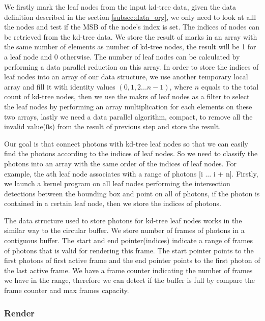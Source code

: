 We firstly mark the leaf nodes from the input kd-tree data, given the data definition described in the section \ref{subsec:data_org}, we only need to look at alll the nodes and test if the MSB of the node's index is set. The indices of nodes can be retrieved from the kd-tree data. We store the result of marks in an array with the same number of elements as number of kd-tree nodes, the result will be 1 for a leaf node and 0 otherwise. The number of leaf nodes can be calculated by performing a data parallel reduction on this array. In order to store the indices of leaf nodes into an array of our data structure, we use another temporary local array and fill it with identity values \( (0, 1, 2 ... n-1) \), where \(n\) equals to the total count of kd-tree nodes, then we use the makrs of leaf nodes as a filter to select the leaf nodes by performing an array multiplication for each elements on these two arrays, lastly we need a data parallel algorithm, compact, to remove all the invalid value(0s) from the result of previous step and store the result. 

Our goal is that connect photons with kd-tree leaf nodes so that we can easily find the photons according to the indices of leaf nodes. So we need to classify the photons into an array with the same order of the indices of leaf nodes. For example, the \(a\)th leaf node associates with a range of photons [i ... i + n]. Firstly, we launch a kernel program on all leaf nodes performing the intersection detections between the bounding box and point on all of photons, if the photon is contained in a certain leaf node, then we store the indices of photons. 

The data structure used to store photons for kd-tree leaf nodes works in the similar way to the circular buffer. We store number of frames of photons in a contiguous buffer. The start and end pointer(indices) indicate a range of frames of photons that is valid for rendering this frame. The start pointer points to the first photons of first active frame and the end pointer points to the first photon of the last active frame. We have a frame counter indicating the number of frames we have in the range, therefore we can detect if the buffer is full by compare the frame counter and max frames capacity. 


\subsubsection{Render} 

